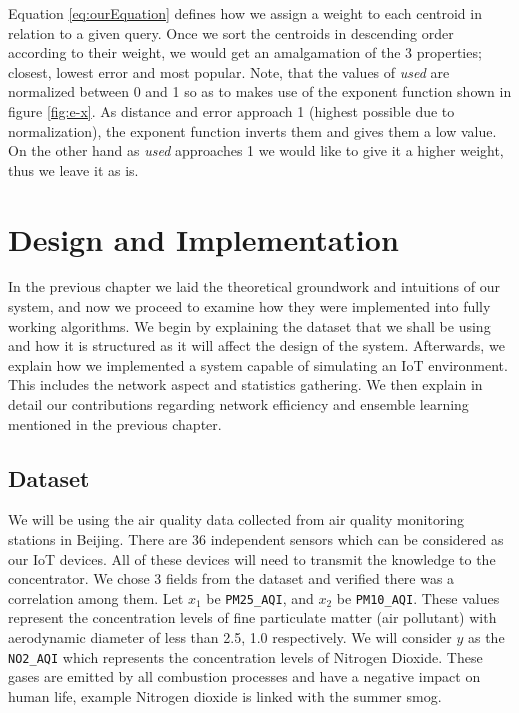 \documentclass{mproj}
\begin{document}
Equation \ref{eq:ourEquation} defines how we assign a weight to each centroid in relation to a given query. Once we sort the centroids in descending order according to their weight, we would get an amalgamation of the 3 properties; closest, lowest error and most popular. Note, that the values of \textit{used} are normalized between 0 and 1 so as to makes use of the exponent function shown in figure \ref{fig:e-x}. As distance and error approach 1 (highest possible due to normalization), the exponent function inverts them and gives them a low value. On the other hand as \textit{used} approaches 1 we would like to give it a higher weight, thus we leave it as is.

\chapter{Design and Implementation}
In the previous chapter we laid the theoretical groundwork and intuitions of our system, and now we proceed to examine how they were implemented into fully working algorithms. We begin by explaining the dataset that we shall be using and how it is structured as it will affect the design of the system. Afterwards, we explain how we implemented a system capable of simulating an IoT environment. This includes the network aspect and statistics gathering. We then explain in detail our contributions regarding network efficiency and ensemble learning mentioned in the previous chapter.

\section{Dataset}
We will be using the air quality data\cite{air-quality-inference-meets-big-data} collected from air quality monitoring stations in Beijing. There are 36 independent sensors which can be considered as our IoT devices. All of these devices will need to transmit the knowledge to the concentrator. We chose 3 fields from the dataset and verified there was a correlation among them. Let $x_1$ be \texttt{PM25\_AQI}, and $x_2$ be \texttt{PM10\_AQI}. These values represent the concentration levels of fine particulate matter (air pollutant) with aerodynamic diameter of less than 2.5, 1.0 respectively. We will consider $y$ as the \texttt{NO2\_AQI} which represents the concentration levels of Nitrogen Dioxide. These gases are emitted by all combustion processes and have a negative impact on human life, example Nitrogen dioxide is linked with the summer smog.\cite{Richter2005}
\end{document}
